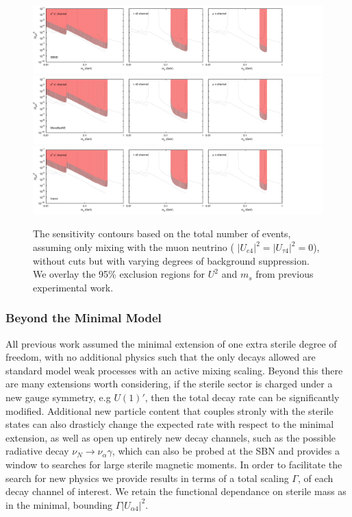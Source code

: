 \documentclass[11pt, a4paper]{article}
\begin{document}
\begin{figure}[t]
\center
\includegraphics[width=1.0\textwidth,clip,trim=0 20 300 15]{figures/sbnd_all_panels_um4.pdf}
\includegraphics[width=1.0\textwidth,clip,trim=0 20 300 15]{figures/muboone_all_panels_um4.pdf}
\includegraphics[width=1.0\textwidth,clip,trim=0 20 300 15]{figures/icarus_all_panels_um4.pdf}

\caption{\label{fig:no_cuts_scaled_bkg_um4_only}The sensitivity contours based on the total
number of events, assuming only mixing with the muon neutrino ( $\vert U_{e 4}\vert^2=\vert U_{\tau 4}\vert^2=0$), without cuts but with varying degrees of background
suppression. We overlay the 95\% exclusion regions for $U^2$ and $m_s$ from
previous experimental work.}

\end{figure}


\subsubsection{Beyond the Minimal Model}
All previous work assumed the minimal extension of one extra sterile degree of freedom, with no additional physics such that the only decays allowed are standard model weak processes with an active mixing scaling. Beyond this there are many extensions worth considering, if the sterile sector is charged under a new gauge symmetry, e.g $U(1)'$, then the total decay rate can be significantly modified. Additional new particle content that couples stronly with the sterile states can also drasticly change the expected rate with respect to the minimal extension, as well as open up entirely new decay channels, such as the possible radiative decay $\nu_N \rightarrow \nu_\alpha \gamma$, which can also be probed at the SBN and provides a window to searches for large sterile magnetic moments. In order to facilitate the search for new physics we provide results in terms of a total scaling $\Gamma$, of each decay channel of interest. We retain the functional dependance on sterile mass as in the minimal, bounding $\Gamma \vert U_{\alpha 4}\vert^2$. \\
\end{document}

